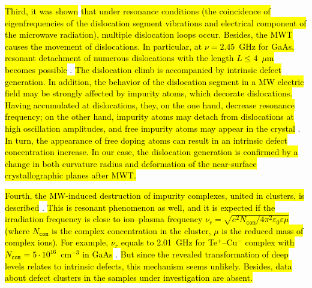 \documentclass[10pt]{iopart}
\begin{document}
\hl{Third, it was shown} \cite{MWT:JLumin,Konakova2007JTFEn,Milenin:SPQEO2019}
\hl{that under resonance conditions
(the coincidence of eigenfrequencies of the dislocation segment vibrations and electrical component of the microwave radiation),
multiple dislocation loops occur.
Besides, the MWT causes the  movement of dislocations.
In particular, at $\nu=2.45$~GHz for GaAs, resonant detachment
of numerous dislocations with the length $L\leq4$~$\mu$m becomes possible} \cite{Milenin:SPQEO2019}.
\hl{The dislocation climb is accompanied by intrinsic defect generation.
In addition, the behavior of the dislocation segment in a MW electric field may be strongly affected by
impurity atoms, which decorate dislocations.
Having accumulated at dislocations, they, on the one hand,
decrease resonance frequency;
on the other hand, impurity atoms may detach from dislocations at
high oscillation amplitudes, and free impurity atoms may appear in the crystal} \cite{MWT:JLumin,Konakova2007JTFEn}.
\hl{In turn, the appearance of free doping atoms can result in an intrinsic defect concentration increase.
In our case, the dislocation generation is confirmed by a change in both curvature radius and
deformation of the near-surface crystallographic planes after MWT.}

\hl{Fourth, the MW-induced destruction of impurity complexes, united in clusters,
is described} \cite{MWT:JLumin,Konakova2007JTFEn,Milenin:SPQEO2019}.
\hl{This is resonant phenomenon as well, and it is expected if the
irradiation frequency is close to ion--plasma frequency
$\nu_r=\sqrt{e^2N_\mathtt{com}/4\pi^2\varepsilon_0\varepsilon\mu}$
(where
$N_\mathtt{com}$ is the complex concentration in the cluster,
$\mu$ is the reduced mass of complex ions).
For example, $\nu_r$ equals to 2.01~GHz for
Te$^+$--Cu$^-$ complex with $N_\mathtt{com}=5\cdot10^{16}$~cm$^{-3}$
in GaAs} \cite{MWT:JLumin}.
\hl{But since the revealed transformation of deep levels
relates to intrinsic defects, this mechanism seems unlikely.
Besides, data about defect clusters in the samples under investigation are absent.}
\end{document}
